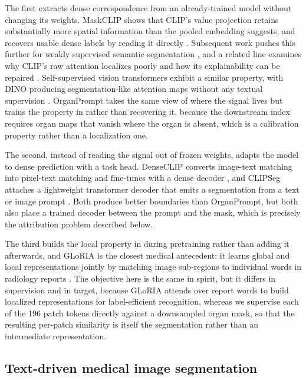 The first extracts dense correspondence from an already-trained model without
changing its weights. MaskCLIP shows that CLIP's value projection retains
substantially more spatial information than the pooled embedding suggests, and
recovers usable dense labels by reading it directly \cite{zhou2022maskclip}.
Subsequent work pushes this further for weakly supervised semantic segmentation
\cite{yang2025clipdense}, and a related line examines why CLIP's raw attention
localizes poorly and how its explainability can be repaired
\cite{li2024clipexplain}. Self-supervised vision transformers exhibit a similar
property, with DINO producing segmentation-like attention maps without any
textual supervision \cite{caron2021dino}. OrganPrompt takes the same view of
where the signal lives but trains the property in rather than recovering it,
because the downstream index requires organ maps that vanish where the organ is
absent, which is a calibration property rather than a localization one.

The second, instead of reading the signal out of frozen weights, adapts the
model to dense prediction with a task head. DenseCLIP converts image-text
matching into pixel-text matching and fine-tunes with a dense decoder
\cite{rao2022denseclip}, and CLIPSeg attaches a lightweight transformer decoder
that emits a segmentation from a text or image prompt
\cite{lueddecke2022clipseg}. Both produce better boundaries than OrganPrompt,
but both also place a trained decoder between the prompt and the mask, which is
precisely the attribution problem described below.

The third builds the local property in during pretraining rather than adding it
afterwards, and GLoRIA is the closest medical antecedent: it learns global and
local representations jointly by matching image sub-regions to individual words
in radiology reports \cite{huang2021gloria}. The objective here is the same in
spirit, but it differs in supervision and in target, because GLoRIA attends over
report words to build localized representations for label-efficient recognition,
whereas we supervise each of the 196 patch tokens directly against a downsampled
organ mask, so that the resulting per-patch similarity is itself the
segmentation rather than an intermediate representation.

\subsection{Text-driven medical image segmentation}

